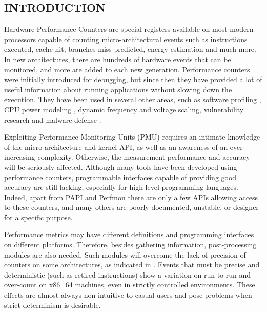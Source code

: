 \subsection{INTRODUCTION}

Hardware Performance Counters are special registers available on most modern processors capable of counting micro-architectural events such as instructions executed, cache-hit, branches miss-predicted, energy estimation and much more.  In new architectures, there are hundreds of hardware events that can be monitored, and more are added to each new generation. 
Performance counters were initially introduced for debugging, but since then they have provided a lot of useful information about running applications without slowing down the execution.
They have been used in several other areas, such as software profiling \cite{Melo2010, Kufrin2005, Knupfer2011}, CPU power modeling \cite{Zamani2012ASystems}, dynamic frequency and voltage scaling, vulnerability research and malware defense \cite{Demme2013OnCounters}.


Exploiting Performance Monitoring Units (PMU) requires an intimate knowledge of the micro-architecture and kernel API, as well as an awareness of an ever increasing complexity. 
Otherwise, the measurement performance and accuracy will be seriously affected. Although many tools have been developed using performance counters, programmable interfaces capable of providing good accuracy are still lacking, especially for high-level programming languages. Indeed, apart from PAPI \cite{Weaver2013, Mucci1999} and Perfmon \cite{EranianPerfmon2Interface, Eranian2005TheSpecification} there are only a few APIs allowing access to these counters, and many others are poorly documented, unstable, or designer for a specific purpose.

Performance metrics may have different definitions and programming interfaces on different platforms. 
Therefore, besides gathering information, post-processing modules are also needed. 
Such modules will overcome the lack of precision of counters on some architectures, as indicated in \cite{Weaver2008,Weaver2013a,Das2019SoK:Security}. 
Events that must be precise and deterministic (such as retired instructions) show a variation on run-to-run and over-count on x86\_64 machines, even in strictly controlled environments. These effects are almost always non-intuitive to casual users and pose problems when strict determinism is desirable. 

